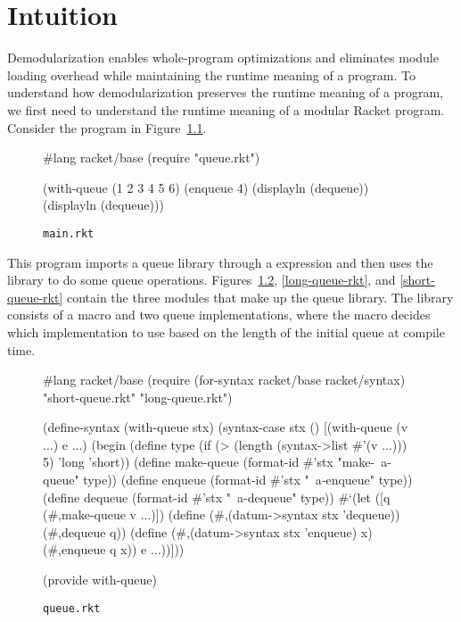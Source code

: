 \documentclass[ms,electronic,letterpaper,lol,lof,lot]{byumsphd}
\begin{document}
\chapter{Intuition}

Demodularization enables whole-program optimizations and eliminates module loading overhead while maintaining the runtime meaning of a program.
To understand how demodularization preserves the runtime meaning of a program, we first need to understand the runtime meaning of a modular Racket program.
Consider the program in Figure~\ref{main-rkt}.

\begin{figure}[h]
\begin{schemedisplay}
#lang racket/base
(require "queue.rkt")

(with-queue (1 2 3 4 5 6)
  (enqueue 4)
  (displayln (dequeue))
  (displayln (dequeue)))
\end{schemedisplay}
\caption{\texttt{main.rkt}}
\label{main-rkt}
\end{figure}

This program imports a queue library through a  expression and then uses the library to do some queue operations.
Figures~\ref{queue-rkt}, \ref{long-queue-rkt}, and \ref{short-queue-rkt} contain the three modules that make up the queue library.
The library consists of a macro and two queue implementations, where the macro decides which implementation to use based on the length of the initial queue at compile time.

\begin{figure}[h]
\begin{schemedisplay}
#lang racket/base
(require (for-syntax racket/base
                     racket/syntax)
         "short-queue.rkt"
         "long-queue.rkt")

(define-syntax (with-queue stx)
  (syntax-case stx ()
    [(with-queue (v ...) e ...)
     (begin
       (define type 
         (if (> (length (syntax->list #'(v ...))) 5) 
	     'long 
             'short))
       (define make-queue 
         (format-id #'stx "make-~a-queue" type))
       (define enqueue (format-id #'stx "~a-enqueue" type))
       (define dequeue (format-id #'stx "~a-dequeue" type))
       #`(let ([q (#,make-queue v ...)])
           (define (#,(datum->syntax stx 'dequeue)) 
             (#,dequeue q))
           (define (#,(datum->syntax stx 'enqueue) x)
             (#,enqueue q x))
           e ...))]))

(provide with-queue)
\end{schemedisplay}
\caption{\texttt{queue.rkt}}
\label{queue-rkt}
\end{figure}
\end{document}
